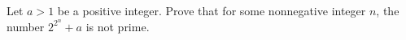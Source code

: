 Let $a > 1$ be a positive integer. Prove that for some nonnegative integer $n$, the number $2^{2^n}+a$ is not prime.